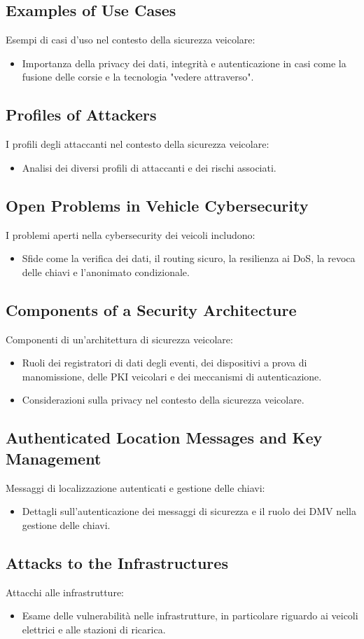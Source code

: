 \subsection{Examples of Use Cases}
Esempi di casi d'uso nel contesto della sicurezza veicolare:  
\begin{itemize} 
  \item Importanza della privacy dei dati, integrità e autenticazione in casi come la
    fusione delle corsie e la tecnologia "vedere attraverso".
\end{itemize}

\subsection{Profiles of Attackers}
I profili degli attaccanti nel contesto della sicurezza veicolare: 
\begin{itemize} 
  \item Analisi dei diversi profili di attaccanti e dei rischi associati. 
\end{itemize}

\subsection{Open Problems in Vehicle Cybersecurity}
I problemi aperti nella cybersecurity dei veicoli includono: 
\begin{itemize} 
  \item Sfide come la verifica dei dati, il routing sicuro, la resilienza ai DoS, la
    revoca delle chiavi e l'anonimato condizionale.
\end{itemize}

\subsection{Components of a Security Architecture}
Componenti di un'architettura di sicurezza veicolare: 
\begin{itemize} 
  \item Ruoli dei registratori di dati degli eventi, dei dispositivi a prova di
    manomissione, delle PKI veicolari e dei meccanismi di autenticazione. 
  \item Considerazioni sulla privacy nel contesto della sicurezza veicolare. 
\end{itemize}

\subsection{Authenticated Location Messages and Key Management}
Messaggi di localizzazione autenticati e gestione delle chiavi: 
\begin{itemize} 
  \item Dettagli sull'autenticazione dei messaggi di sicurezza e il ruolo dei DMV nella
    gestione delle chiavi. 
\end{itemize}

\subsection{Attacks to the Infrastructures}
Attacchi alle infrastrutture: 
\begin{itemize}
  \item Esame delle vulnerabilità nelle infrastrutture, in particolare riguardo ai veicoli
    elettrici e alle stazioni di ricarica. 
\end{itemize}

